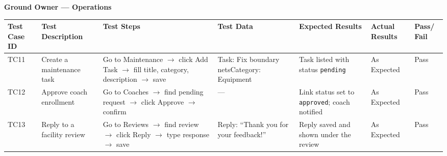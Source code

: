 \documentclass[12pt,a4paper]{article}
\begin{document}
\vspace{0.4cm}
\begin{center}{\Large\bfseries Ground Owner --- Operations}\end{center}
\vspace{0.3cm}

\begin{center}
\begin{longtable}{|C{1.0cm}|L{2.5cm}|L{2.5cm}|L{3.5cm}|L{2.5cm}|L{1.5cm}|C{1.0cm}|}
\hline
\textbf{Test Case ID} & \textbf{Test Description} & \textbf{Test Steps} & \textbf{Test Data} & \textbf{Expected Results} & \textbf{Actual Results} & \textbf{Pass/ Fail}\\
\hline
\endhead

TC11
& Create a maintenance task
& Go to Maintenance $\to$ click Add Task $\to$ fill title, category, description $\to$ save
& Task: Fix boundary nets\newline Category: Equipment
& Task listed with status \texttt{pending}
& As Expected
& Pass
\\ \hline

TC12
& Approve coach enrollment
& Go to Coaches $\to$ find pending request $\to$ click Approve $\to$ confirm
& ---
& Link status set to \texttt{approved}; coach notified
& As Expected
& Pass
\\ \hline

TC13
& Reply to a facility review
& Go to Reviews $\to$ find review $\to$ click Reply $\to$ type response $\to$ save
& Reply: ``Thank you for your feedback!''
& Reply saved and shown under the review
& As Expected
& Pass
\\ \hline

\end{longtable}
\end{center}
\end{document}
